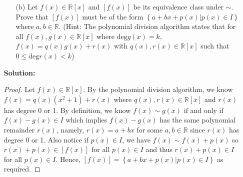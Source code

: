\documentclass[letterpaper,12pt]{article}
\newcommand{\set}[1]{\left\{ #1 \right\}}
\theoremstyle{definition}
\begin{document}
\pagebreak
\begin{enumerate}
    \item[] \begin{enumerate}
        \item[(b)] Let $f(x) \in \mathbb{R}[x]$ and $[f(x)]$ be its equivalence class under $\sim$. Prove that $[f(x)]$ must be of the form $\set{a + bx + p(x) | p(x) \in I}$ where $a,b \in \mathbb{R}$. (Hint: The polynomial division algorithm states that for all $f(x),g(x) \in \mathbb{R}[x]$ where $\mathrm{deg}g(x) = k$, $f(x)=q(x)g(x)+r(x)$ with $q(x),r(x) \in \mathbb{R}[x]$ such that $0 \leq \mathrm{deg}r(x) < k$)
    \end{enumerate}
    \begin{mdframed}
            \textbf{Solution:}
            \begin{proof}
                Let $f(x) \in \mathbb{R}[x]$. By the polynomial division algorithm, we know $f(x) = q(x)(x^2+1) + r(x)$ where $q(x), r(x)\in \mathbb{R}[x]$ and $r(x)$ has degree 0 or 1. By definition, we know $f(x) \sim g(x)$ if and only if $f(x) - g(x) \in I$ which implies $f(x)-g(x)$ has the same polynomial remainder $r(x)$, namely, $r(x) = a+bx$ for some $a,b \in \mathbb{R}$ since $r(x)$ has degree 0 or 1. Also notice if $p(x) \in I$, we have $f(x) \sim f(x) + p(x)$ so $r(x) + p(x) \in [f(x)]$ for all $p(x) \in I$ and thus $r(x) + p(x) \in I$ for all $p(x) \in I$. Hence, $[f(x)] = \set{a + bx + p(x) | p(x) \in I}$ as required.
            \end{proof}
        \end{mdframed}
\end{enumerate}
\pagebreak
\end{document}
